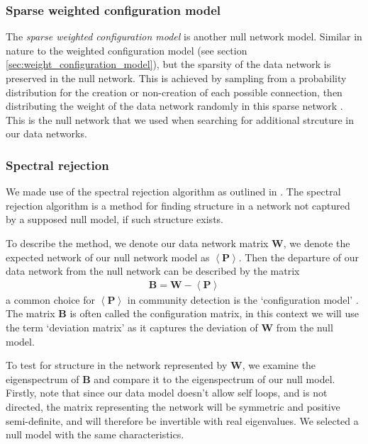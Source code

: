 \documentclass[a4paper,12pt]{article}
\theoremstyle{definition}
\begin{document}
        \subsubsection{Sparse weighted configuration model}\label{sec:sparse_weighted_configuration_model}
        The \textit{sparse weighted configuration model} is another null network model. Similar in nature to the weighted configuration model (see section \ref{sec:weight_configuration_model}), but the sparsity of the data network is preserved in the null network. This is achieved by sampling from a probability distribution for the creation or non-creation of each possible connection, then distributing the weight of the data network randomly in this sparse network \cite{humphries}. This is the null network that we used when searching for additional strcuture in our data networks.

        \subsubsection{Spectral rejection}\label{sec:spectral_rejection}
        We made use of the spectral rejection algorithm as outlined in \cite{humphries}. The spectral rejection algorithm is a method for finding structure in a network not captured by a supposed null model, if such structure exists.

        To describe the method, we denote our data network matrix $\mathbf{W}$, we denote the expected network of our null network model as $\left\langle \mathbf{P} \right\rangle$. Then the departure of our data network from the null network can be described by the matrix
        \begin{align}
          \mathbf{B} = \mathbf{W} - \left\langle \mathbf{P} \right\rangle
        \end{align}
        a common choice for $\left\langle \mathbf{P} \right\rangle$ in community detection is the `configuration model' \cite{fosdick, humphries2}. The matrix $\mathbf{B}$ is often called the configuration matrix, in this context we will use the term `deviation matrix' as it captures the deviation of $\mathbf{W}$ from the null model.

        To test for structure in the network represented by $\mathbf{W}$, we examine the eigenspectrum of $\mathbf{B}$ and compare it to the eigenspectrum of our null model. Firstly, note that since our data model doesn't allow self loops, and is not directed, the matrix representing the network will be symmetric and positive semi-definite, and will therefore be invertible with real eigenvalues. We selected a null model with the same characteristics.
\end{document}
